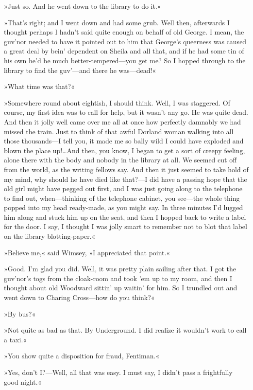 »Just so. And he went down to the library to do it.«

»That's right; and I went down and had some grub. Well then, afterwards I thought perhaps I hadn't said quite enough on behalf of old George. I mean, the guv'nor needed to have it pointed out to him that George's queerness was caused a great deal by bein' dependent on Sheila and all that, and if he had some tin of his own he'd be much better-tempered—you get me? So I hopped through to the library to find the guv'—and there he was—dead!«

»What time was that?«

»Somewhere round about eightish, I should think. Well, I was staggered. Of course, my first idea was to call for help, but it wasn't any go. He was quite dead. And then it jolly well came over me all at once how perfectly damnably we had missed the train. Just to think of that awful Dorland woman walking into all those thousands—I tell you, it made me so bally wild I could have exploded and blown the place up!\dots And then, you know, I began to get a sort of creepy feeling, alone there with the body and nobody in the library at all. We seemed cut off from the world, as the writing fellows say. And then it just seemed to take hold of my mind, why should he have died like that?—I did have a passing hope that the old girl might have pegged out first, and I was just going along to the telephone to find out, when—thinking of the telephone cabinet, you see—the whole thing popped into my head ready-made, as you might say. In three minutes I'd lugged him along and stuck him up on the seat, and then I hopped back to write a label for the door. I say, I thought I was jolly smart to remember not to blot that label on the library blotting-paper.«

»Believe me,« said Wimsey, »I appreciated that point.«

»Good. I'm glad you did. Well, it was pretty plain sailing after that. I got the guv'nor's togs from the cloak-room and took 'em up to my room, and then I thought about old Woodward sittin' up waitin' for him. So I trundled out and went down to Charing Cross—how do you think?«

»By bus?«

»Not quite as bad as that. By Underground. I did realize it wouldn't work to call a taxi.«

»You show quite a disposition for fraud, Fentiman.«

»Yes, don't I\@?—Well, all that was easy. I must say, I didn't pass a frightfully good night.«

